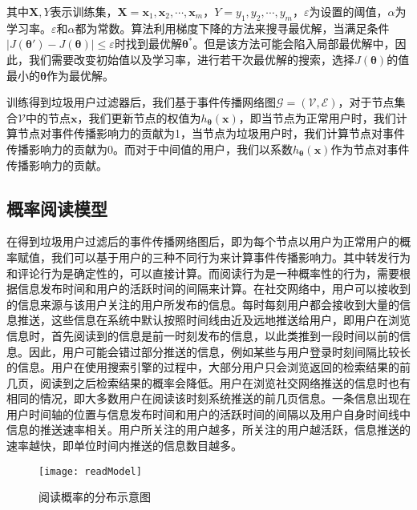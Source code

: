 其中$\mathbf{X},Y$表示训练集，$\mathbf{X}={\mathbf{x}_1, \mathbf{x}_2, \cdots, \mathbf{x}_m}$，$Y = {y_1, y_2, \cdots, y_m}$，$\varepsilon$为设置的阈值，$\alpha$为学习率。$\varepsilon$和$\alpha$都为常数。算法利用梯度下降的方法来搜寻最优解，当满足条件$\vert J\left(\bm{\theta}'\right) - J\left(\bm{\theta}\right)\vert \leq \varepsilon$时找到最优解$\bm{\theta}^{\ast}$。但是该方法可能会陷入局部最优解中，因此，我们需要改变初始值以及学习率，进行若干次最优解的搜索，选择$J\left(\bm{\theta}\right)$的值最小的$\bm{\theta}$作为最优解。

训练得到垃圾用户过滤器后，我们基于事件传播网络图$\mathcal{G}=\left(\mathcal{V},\mathcal{E}\right)$，对于节点集合$\mathcal{V}$中的节点$\mathbf{x}$，我们更新节点的权值为$h_ {\bm{\theta}} \left(\mathbf{x}\right)$，即当节点为正常用户时，我们计算节点对事件传播影响力的贡献为1，当节点为垃圾用户时，我们计算节点对事件传播影响力的贡献为0。而对于中间值的用户，我们以系数$h_ {\bm{\theta}} \left(\mathbf{x}\right)$作为节点对事件传播影响力的贡献。

\subsection{概率阅读模型}
\label{subsec5:readModel}
在得到垃圾用户过滤后的事件传播网络图后，即为每个节点以用户为正常用户的概率赋值，我们可以基于用户的三种不同行为来计算事件传播影响力。其中转发行为和评论行为是确定性的，可以直接计算。而阅读行为是一种概率性的行为，需要根据信息发布时间和用户的活跃时间的间隔来计算。在社交网络中，用户可以接收到的信息来源与该用户关注的用户所发布的信息。每时每刻用户都会接收到大量的信息推送，这些信息在系统中默认按照时间线由近及远地推送给用户，即用户在浏览信息时，首先阅读到的信息是前一时刻发布的信息，以此类推到一段时间以前的信息。因此，用户可能会错过部分推送的信息，例如某些与用户登录时刻间隔比较长的信息。用户在使用搜索引擎的过程中，大部分用户只会浏览返回的检索结果的前几页，阅读到之后检索结果的概率会降低。用户在浏览社交网络推送的信息时也有相同的情况，即大多数用户在阅读该时刻系统推送的前几页信息。一条信息出现在用户时间轴的位置与信息发布时间和用户的活跃时间的间隔以及用户自身时间线中信息的推送速率相关。用户所关注的用户越多，所关注的用户越活跃，信息推送的速率越快，即单位时间内推送的信息数目越多。

\begin{figure}[!ht]
    \centering
    \texttt{[image: readModel]}
    \caption{阅读概率的分布示意图}
    \label{fig:readModel}
\end{figure}

